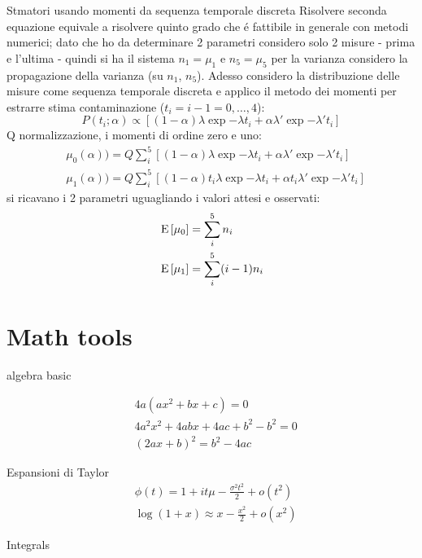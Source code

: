 \begin{frame}{Stmatori usando momenti da sequenza temporale discreta}
Risolvere seconda equazione equivale a risolvere quinto grado che \'e fattibile in generale con metodi numerici; dato che ho da determinare 2 parametri considero solo 2 misure - prima e l'ultima - quindi si ha il sistema $n_1=\mu_1$ e $n_5=\mu_5$ per la varianza considero la propagazione della varianza (su $n_1$, $n_5$).
Adesso considero la distribuzione delle misure come sequenza temporale discreta e applico il metodo dei momenti per estrarre stima contaminazione ($t_i=i-1=0,\ldots,4$):
\[P(t_i;\alpha)\propto[(1-\alpha)\lambda\exp{-\lambda t_i}+\alpha\lambda'\exp{-\lambda't_i}]\]
Q normalizzazione, i momenti di ordine zero e uno:
\begin{align*}
&\mu_0(\alpha))=Q\sum_i^5[(1-\alpha)\lambda\exp{-\lambda t_i}+\alpha\lambda'\exp{-\lambda't_i}]\\
&\mu_1(\alpha))=Q\sum_i^5[(1-\alpha)t_i\lambda\exp{-\lambda t_i}+\alpha t_i\lambda'\exp{-\lambda't_i}]
\end{align*}
si ricavano i 2 parametri uguagliando i valori attesi e osservati:
\begin{align*}
&\operatorname{E}{[\mu_0]}=\sum_i^5n_i\\
&\operatorname{E}{[\mu_1]}=\sum_i^5(i-1)n_i
\end{align*}
\end{frame}

\section{Math tools}

\begin{frame}{algebra basic}

\begin{align*}
&4a(ax^2+bx+c)=0\\
&4a^2x^2+4abx+4ac+b^2-b^2=0\\
&(2ax+b)^2=b^2-4ac
\end{align*}
%
\end{frame}

\begin{wordonframe}{Espansioni di Taylor}
	\begin{align*}
	&\phi(t)=1+it\mu-\frac{\sigma^2t^2}{2}+o(t^2)\\
	&\log{(1+x)}\approx x-\frac{x^2}{2}+o(x^2)
	\end{align*}
\end{wordonframe}

\begin{frame}{Integrals}
\begin{columns}[T]\begin{column}{0.5\textwidth}

\end{column}\begin{column}{0.5\textwidth}
\end{column}\end{columns}
\end{frame}